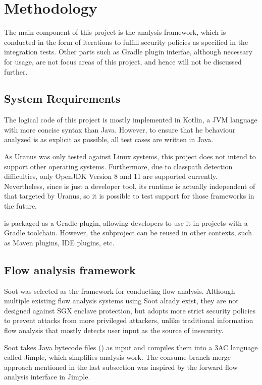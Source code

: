 \section{Methodology}
The main component of this project is the analysis framework,
which is conducted in the form of iterations
to fulfill security policies as specified in the integration tests.
Other parts such as Gradle plugin interfae,
although necessary for usage,
are not focus areas of this project, and hence will not be discussed further.



\subsection{System Requirements}
The logical code of this project is mostly implemented in Kotlin,
a JVM language with more concise syntax than Java.
However, to ensure that he behaviour analyzed
is as explicit as possible,
all test cases are written in Java.

As Uranus was only tested against Linux systems,
this project does not intend to support other operating systems.
Furthermore, due to classpath detection difficulties,
only OpenJDK Version 8 and 11 are supported currently.
Nevertheless, since \pname{} is just a developer tool,
its runtime is actually independent of that targeted by Uranus,
so it is possible to test support for those frameworks in the future.

\pname{} is packaged as a Gradle plugin,
allowing developers to use it in projects with a Gradle toolchain.
However, the  subproject can be reused in other contexts,
such as Maven plugins, IDE plugins, etc.

\subsection{Flow analysis framework}
Soot \cite{sootsurvivor} was selected as the framework for conducting flow analysis.
Although multiple existing flow analysis systems using Soot alrady exist,
they are not designed against SGX enclave protection,
but \pname{} adopts more strict security policies
to prevent attacks from more privileged attackers,
unlike traditional information flow analysis
that mostly detects user input as the source of insecurity.

Soot takes Java bytecode files () as input
and compiles them into a 3AC language called Jimple,
which simplifies analysis work.
The consume-branch-merge approach mentioned in the last subsection
was inspired by the forward flow analysis interface in Jimple.

